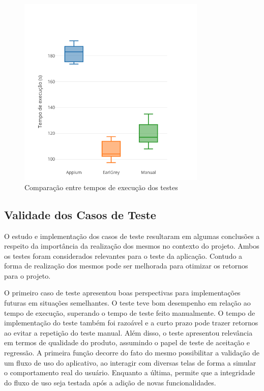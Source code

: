 \begin{figure}[H]
    \centering
    \includegraphics[width=0.8\textwidth]{pfc/figuras/box-plot-time.png}
    \caption{Comparação entre tempos de execução dos testes}
    \label{fig:box-plot-time}
\end{figure}

\subsection{Validade dos Casos de Teste}
O estudo e implementação dos casos de teste resultaram em algumas conclusões a respeito da importância da realização dos mesmos no contexto do projeto. Ambos os testes foram considerados relevantes para o teste da aplicação. Contudo a forma de realização dos mesmos pode ser melhorada para otimizar os retornos para o projeto.

O primeiro caso de teste apresentou boas perspectivas para implementações futuras em situações semelhantes. O teste teve bom desempenho em relação ao tempo de execução, superando o tempo de teste feito manualmente. O tempo de implementação do teste também foi razoável e a curto prazo pode trazer retornos ao evitar a repetição do teste manual. Além disso, o teste apresentou relevância em termos de qualidade do produto, assumindo o papel de teste de aceitação e regressão. A primeira função decorre do fato do mesmo possibilitar a validação de um fluxo de uso do aplicativo, ao interagir com diversas telas de forma a simular o comportamento real do usuário. Enquanto a última, permite que a integridade do fluxo de uso seja testada após a adição de novas funcionalidades.

